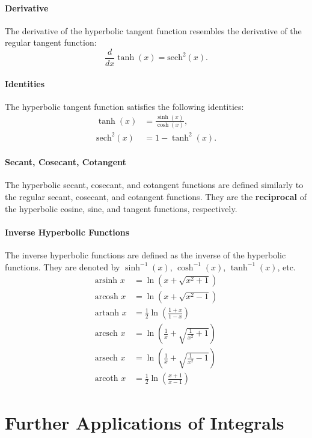 \documentclass[11pt]{article}
\begin{document}
\paragraph{Derivative} The derivative of the hyperbolic tangent function resembles the derivative of the regular tangent function:
\begin{equation} \frac{d}{dx} \tanh(x) = \text{sech}^2(x). \end{equation}
\paragraph{Identities} The hyperbolic tangent function satisfies the following identities:
\begin{align}
    \tanh(x) &= \frac{\sinh(x)}{\cosh(x)}, \\
    \text{sech}^2(x) &= 1 - \tanh^2(x).
\end{align}
\paragraph{Secant, Cosecant, Cotangent} The hyperbolic secant, cosecant, and cotangent functions are defined similarly to the regular secant, cosecant, and cotangent functions. They are the \textbf{reciprocal} of the hyperbolic cosine, sine, and tangent functions, respectively.
\paragraph{Inverse Hyperbolic Functions} The inverse hyperbolic functions are defined as the inverse of the hyperbolic functions. They are denoted by $\sinh^{-1}(x)$, $\cosh^{-1}(x)$, $\tanh^{-1}(x)$, etc.
\begin{align}
    \text{arsinh } x &= \ln\left(x + \sqrt{x^2 + 1}\right) \\[10pt]
    \text{arcosh } x &= \ln\left(x + \sqrt{x^2 - 1}\right) \\[10pt]
    \text{artanh } x &= \frac{1}{2} \ln\left(\frac{1 + x}{1 - x}\right) \\[10pt]
    \text{arcsch } x &= \ln\left(\frac{1}{x} + \sqrt{\frac{1}{x^2} + 1}\right) \\[10pt]
    \text{arsech } x &= \ln\left(\frac{1}{x} + \sqrt{\frac{1}{x^2} - 1}\right) \\[10pt]
    \text{arcoth } x &= \frac{1}{2} \ln\left(\frac{x + 1}{x - 1}\right)
\end{align}
\section{Further Applications of Integrals}
\end{document}
